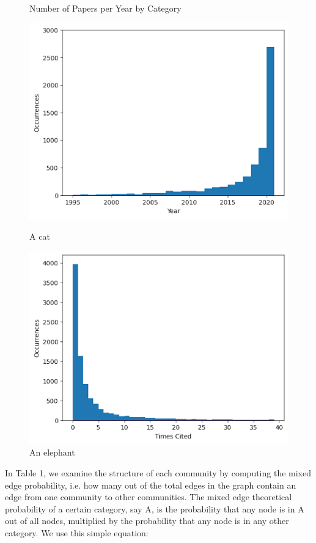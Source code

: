 \documentclass[conference]{IEEEtran}
\begin{document}
\begin{figure}[htbp]
    \caption{Number of Papers per Year by Category}
    \captionsetup{labelformat=empty}
    \parbox[b]{.5\linewidth}{
    \includegraphics[scale=0.23]{papers_by_year.png}
    \caption{A cat}\label{cat}}
    \parbox[b]{.45\linewidth}{
    \includegraphics[scale=0.23]{times_cited.png}
    \caption{An elephant}\label{elephant}}
    \captionsetup{labelformat=simple}
\end{figure}

In Table 1, we examine the structure of each community by computing the mixed 
edge probability, i.e. how many out of the total edges in the graph contain 
an edge from one community to other communities. The mixed edge theoretical 
probability of a certain category, say A, is the probability that any node 
is in A out of all nodes, multiplied by the probability that any node is 
in any other category. We use this simple equation: \par
\end{document}
